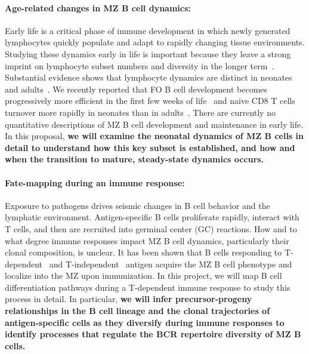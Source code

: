 \documentclass[11pt]{article}
\newcommand{\para}[1]{\vspace*{-4.5mm}\paragraph{#1}}
\begin{document}
\para{Age-related changes in MZ B cell dynamics:} 
Early life is a critical phase of immune development in which newly generated lymphocytes quickly populate and adapt to rapidly changing tissue environments.
Studying these dynamics early in life is important because they leave a strong imprint on lymphocyte subset numbers and diversity in the longer term~\cite{Farber_2013, Hogan_2015, Gaimann_2020,  Davenport_2020}.
Substantial evidence shows that lymphocyte dynamics are distinct in neonates and adults~\cite{LeCampion_2002, Scho_nland_2003,Reynaldi_2019}. 
We recently reported that FO B cell development becomes progressively more efficient in the first few weeks of life~\cite{Verheijen_2020} and naive CD8 T cells turnover more rapidly in neonates than in adults~\cite{Rane_2022}.
There are currently no quantitative descriptions of MZ B cell development and maintenance in early life.
In this proposal, \textbf{we will examine the neonatal dynamics of MZ B cells in detail to understand how this key subset is established, and how and when the transition to mature, steady-state dynamics occurs.}


\para{Fate-mapping during an immune response:} 
Exposure to pathogens drives seismic changes in B cell behavior and the lymphatic environment. Antigen-specific B cells proliferate rapidly, interact with T cells, and then are recruited into germinal center (GC) reactions. 
How and to what degree immune responses impact MZ B cell dynamics, particularly their clonal composition, is unclear.
It has been shown that B cells responding to T-dependent~\cite{Liu_1988, Yang_Shih_2002} and T-independent~\cite{Vinuesa_2003} antigen acquire the MZ B cell phenotype and localize into the MZ upon immunization.
In this project, we will map B cell differentiation pathways during a T-dependent immune response to study this process in detail. %
In particular, \textbf{we will infer precursor-progeny relationships in the B cell lineage and the clonal trajectories of antigen-specific cells as they diversify during immune responses to identify processes that regulate the BCR repertoire diversity of MZ B cells.}
 
\end{document}

